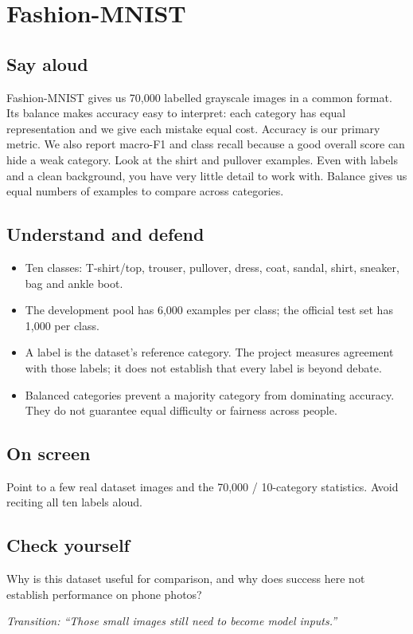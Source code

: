 \documentclass[11pt,a4paper]{article}
\newcommand{\slide}[3]{\clearpage{\small\color{olive}SLIDE #1\hfill Target: #3}\par\section{#2}}
\newcommand{\say}{\subsection{Say aloud}}
\newcommand{\understand}{\subsection{Understand and defend}}
\newcommand{\screen}{\subsection{On screen}}
\newcommand{\selfcheck}[1]{\subsection{Check yourself}#1}
\newcommand{\transition}[1]{\par\smallskip\textit{Transition: #1}}
\begin{document}
\slide{2}{Fashion-MNIST}{35 seconds}
\say
Fashion-MNIST gives us 70,000 labelled grayscale images in a common format. Its balance makes accuracy easy to interpret: each category has equal representation and we give each mistake equal cost. Accuracy is our primary metric. We also report macro-F1 and class recall because a good overall score can hide a weak category. Look at the shirt and pullover examples. Even with labels and a clean background, you have very little detail to work with. Balance gives us equal numbers of examples to compare across categories.
\understand
\begin{itemize}
\item Ten classes: T-shirt/top, trouser, pullover, dress, coat, sandal, shirt, sneaker, bag and ankle boot.
\item The development pool has 6,000 examples per class; the official test set has 1,000 per class.
\item A label is the dataset's reference category. The project measures agreement with those labels; it does not establish that every label is beyond debate.
\item Balanced categories prevent a majority category from dominating accuracy. They do not guarantee equal difficulty or fairness across people.
\end{itemize}
\screen
Point to a few real dataset images and the 70,000 / 10-category statistics. Avoid reciting all ten labels aloud.
\selfcheck{Why is this dataset useful for comparison, and why does success here not establish performance on phone photos?}
\transition{``Those small images still need to become model inputs.''}
\end{document}
